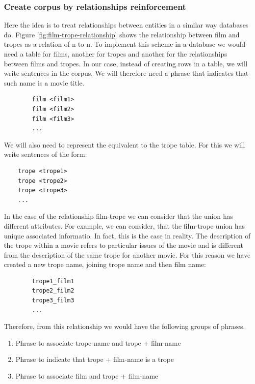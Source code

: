 \documentclass[letterpaper]{article}
\begin{document}
	\subsubsection{Create corpus by relationships reinforcement}
	
	Here the idea is to treat relationships between entities in a similar way databases do. Figure \ref{fig:film-trope-relationship} shows the relationship between
	 film and tropes as a relation of n to n. To implement this scheme in a database we would need a table for films, another for tropes and another for the relationships 
	 between films and tropes. In our case, instead of creating rows in a table, we will write sentences in the corpus. We will therefore need a phrase that indicates that such
	 name is a movie title.
	 
	 	\begin{verbatim}
	 	film <film1>
	 	film <film2>
	 	film <film3>
	 	...
	 	\end{verbatim}
	 	
	 We will also need to represent the equivalent to the trope table. For this we will write sentences of the form:
		\begin{verbatim}
	trope <trope1>
	trope <trope2>
	trope <trope3>
	...
	\end{verbatim}
	
	In the case of the relationship film-trope we can consider that the union has different attributes. For example, we can consider, that the film-trope union has unique associated informatio.  In fact, this is the case in reality. The description of the trope within a movie refers to particular issues of the movie and is different from the description of the same trope for another movie. For this reason we have created a new trope name, joining trope name and then film name:
		\begin{verbatim}
		trope1_film1
		trope2_film2
		trope3_film3
		...		
	    \end{verbatim}
	    
	Therefore, from this relationship we would have the following groups of phrases.
	\begin{enumerate}
		\item Phrase to associate trope-name and trope + film-name
		\item Phrase to indicate that trope + film-name is a trope
		\item Phrase to associate film and trope + film-name 
	\end{enumerate}     
	
\end{document}
